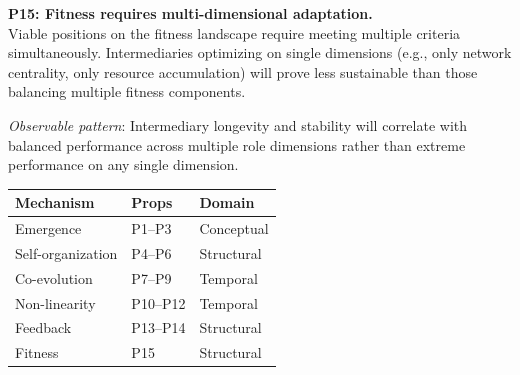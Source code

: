 \documentclass[../main.tex]{subfiles}
\begin{document}
\begin{propositionbox}
\textbf{P15: Fitness requires multi-dimensional adaptation.}\\[3pt]
Viable positions on the fitness landscape require meeting multiple criteria simultaneously. Intermediaries optimizing on single dimensions (e.g., only network centrality, only resource accumulation) will prove less sustainable than those balancing multiple fitness components.

\vspace{4pt}
\textit{Observable pattern}: Intermediary longevity and stability will correlate with balanced performance across multiple role dimensions rather than extreme performance on any single dimension.
\end{propositionbox}

\begin{margintable}
\centering
\caption{Proposition summary by mechanism}
\scriptsize
\begin{tabular}{@{}lll@{}}
\toprule
\textbf{Mechanism} & \textbf{Props} & \textbf{Domain} \\
\midrule
Emergence & P1--P3 & Conceptual \\
Self-organization & P4--P6 & Structural \\
Co-evolution & P7--P9 & Temporal \\
Non-linearity & P10--P12 & Temporal \\
Feedback & P13--P14 & Structural \\
Fitness & P15 & Structural \\
\bottomrule
\end{tabular}
\end{margintable}

\clearpage
\end{document}
